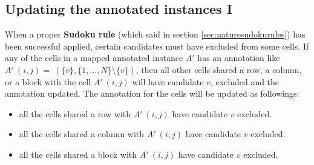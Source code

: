 \documentclass[11pt]{report}
\newcommand{\set}[1]{\{ #1 \}}
\begin{document}
\subsection{Updating the annotated instances I}
\label{sec:UpdatingtheinstancesI}

When a proper \textbf{Sudoku rule} (which said in section \ref{sec:naturesudokurules}) has been successful applied, certain candidates must have excluded from some cells. If any of the cells in a mapped annotated instance $A'$ has an annotation like $A'\ (i,j) =\ (\set{v}, \set{1,\dots,N} \setminus \set{v})$, then all other cells shared a row, a column, or a block with the cell $A'\ (i,j)$ will have candidate $v$, excluded and the annotation updated. The annotation for the cells will be updated as followings:
\begin{itemize}
\item all the cells shared a row with $A'\ (i,j)$ have candidate $v$ excluded.
\item all the cells shared a column with $A'\ (i,j)$ have candidate $v$ excluded.
\item all the cells shared a block with $A'\ (i,j)$ have candidate $v$ excluded.
\end{itemize} 
\end{document}
